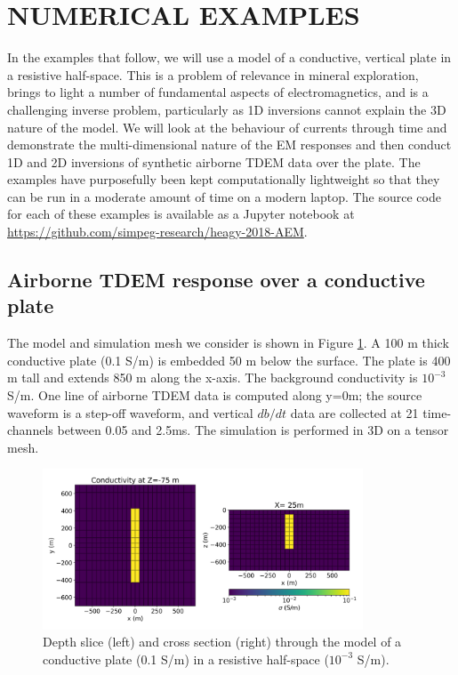\documentclass[paper]{geophysics}
\begin{document}
\section{NUMERICAL EXAMPLES}
In the examples that follow, we will use a model of a conductive, vertical plate in a resistive half-space. This is a problem of relevance in mineral exploration, brings to light a number of fundamental aspects of electromagnetics, and is a challenging inverse problem, particularly as 1D inversions cannot explain the 3D nature of the model. We will look at the behaviour of currents through time and demonstrate the multi-dimensional nature of the EM responses and then conduct 1D and 2D inversions of synthetic airborne TDEM data over the plate. The examples have purposefully been kept computationally lightweight so that they can be run in a moderate amount of time on a modern laptop. The source code for each of these examples is available as a Jupyter notebook at
\href{https://github.com/simpeg-research/heagy-2018-AEM}{https://github.com/simpeg-research/heagy-2018-AEM}.

\subsection{Airborne TDEM response over a conductive plate}
The model and simulation mesh we consider is shown in Figure \ref{fig:model}. A 100 m thick conductive plate (0.1 S/m) is embedded 50 m below the surface. The plate is 400 m tall and extends 850 m along the x-axis. The background conductivity is $10^{-3}$ S/m. One line of airborne TDEM data is computed along y=0m; the source waveform is a step-off waveform, and vertical $db/dt$ data are collected at 21 time-channels between 0.05 and 2.5ms. The simulation is performed in 3D on a tensor mesh.

\begin{figure}[!htb]
  \centering
  \includegraphics[width=0.85\textwidth]{figures/model.png}
  \caption{Depth slice (left) and cross section (right) through the model of a conductive plate (0.1 S/m) in a resistive half-space ($10^{-3}$ S/m).}
  \label{fig:model}
\end{figure}
\end{document}

